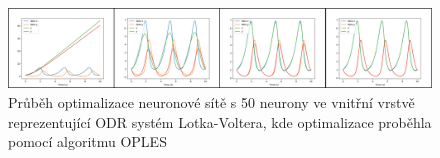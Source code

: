 \begin{figure}[h]
\begin{center}
  \includegraphics[width=\textwidth]{figures/LotkaVoltera_NN_OPLES}
\end{center}
\caption{Průběh optimalizace neuronové sítě s 50 neurony ve vnitřní vrstvě
reprezentující ODR systém Lotka-Voltera, kde optimalizace proběhla pomocí algoritmu OPLES}
\label{fig:lotka_voltera_oples}
\end{figure}

